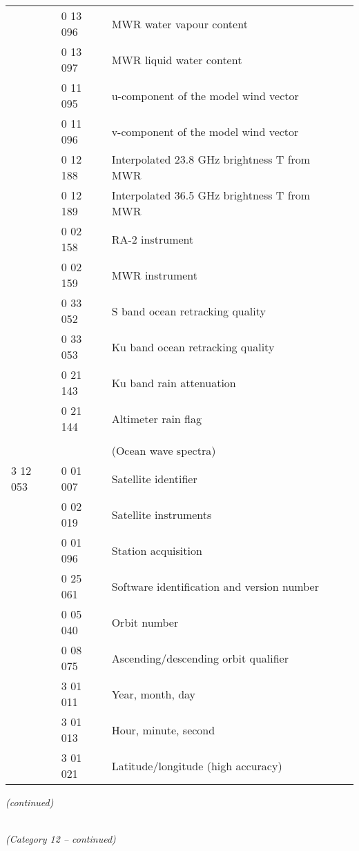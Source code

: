 \begin{longtable}[]{@{}llll@{}}
& 0 13 096 & MWR water vapour content &\tabularnewline
& 0 13 097 & MWR liquid water content &\tabularnewline
& 0 11 095 & u-component of the model wind vector &\tabularnewline
& 0 11 096 & v-component of the model wind vector &\tabularnewline
& 0 12 188 & Interpolated 23.8 GHz brightness T from MWR &\tabularnewline
& 0 12 189 & Interpolated 36.5 GHz brightness T from MWR &\tabularnewline
& 0 02 158 & RA-2 instrument &\tabularnewline
& 0 02 159 & MWR instrument &\tabularnewline
& 0 33 052 & S band ocean retracking quality &\tabularnewline
& 0 33 053 & Ku band ocean retracking quality &\tabularnewline
& 0 21 143 & Ku band rain attenuation &\tabularnewline
& 0 21 144 & Altimeter rain flag &\tabularnewline
& & &\tabularnewline
& & (Ocean wave spectra) &\tabularnewline
3 12 053 & 0 01 007 & Satellite identifier &\tabularnewline
& 0 02 019 & Satellite instruments &\tabularnewline
& 0 01 096 & Station acquisition &\tabularnewline
& 0 25 061 & Software identification and version number &\tabularnewline
& 0 05 040 & Orbit number &\tabularnewline
& 0 08 075 & Ascending/descending orbit qualifier &\tabularnewline
& 3 01 011 & Year, month, day &\tabularnewline
& 3 01 013 & Hour, minute, second &\tabularnewline
& 3 01 021 & Latitude/longitude (high accuracy) &\tabularnewline
\bottomrule
\end{longtable}

\emph{(continued)}

\emph{\\
(Category 12 -- continued)}

